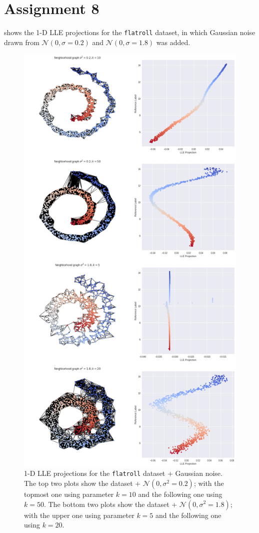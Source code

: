 \documentclass[a4paper,11pt]{article}
\begin{document}
\section*{Assignment 8}

 shows the 1-D LLE projections for the \verb|flatroll| dataset, in which Gaussian noise drawn from $\mathcal{N}(0, \sigma=0.2)$ and $\mathcal{N}(0, \sigma=1.8)$ was added.

\begin{figure}
	\centering
	\includegraphics[height=0.85\textheight]{images/assignment8.png}
	\caption{1-D LLE projections for the \texttt{flatroll} dataset + Gaussian noise.
			 The top two plots show the dataset + $\mathcal{N}(0, \sigma^2=0.2)$;
			 with the topmost one using parameter $k=10$ and the following one
			 using $k=50$.
			 The bottom two plots show the dataset + $\mathcal{N}(0, \sigma^2=1.8)$;
			 with the upper one using parameter $k=5$ and the following one using
			 $k=20$.
		 }
	\label{fig:assignment8}
\end{figure}
\end{document}
